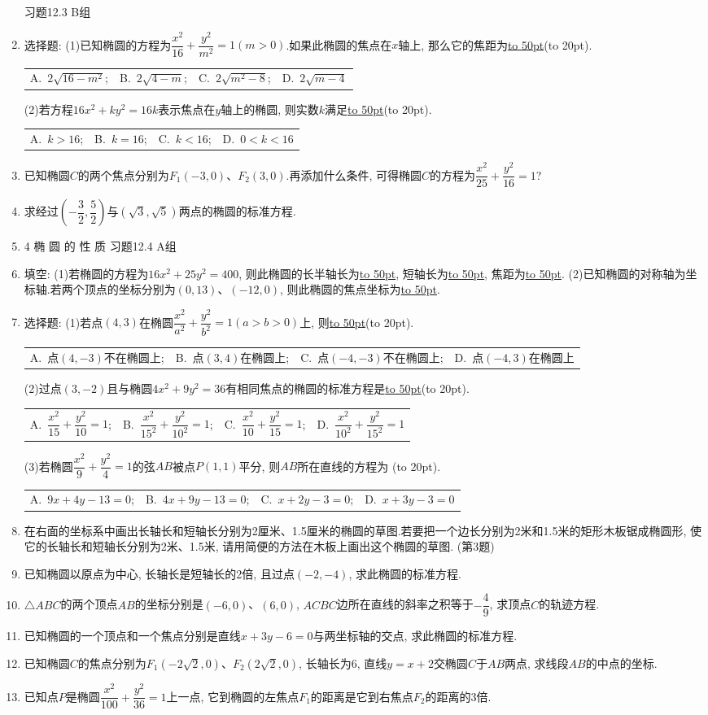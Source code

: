 \documentclass[10pt,a4paper]{article}
\newcommand{\blank}[1]{\underline{\hbox to #1pt{}}}
\newcommand{\bracket}[1]{(\hbox to #1pt{})}
\newcommand{\fourch}[4]{\par\begin{tabular}{p{.23\textwidth}p{.23\textwidth}p{.23\textwidth}p{.23\textwidth}}
A.~#1 &B.~#2& C.~#3& D.~#4
\end{tabular}}
\begin{document}
\begin{enumerate}[1.]
习题12.3  B组
\item 选择题:
(1)已知椭圆的方程为$\dfrac{x^2}{16}+\dfrac{y^2}{m^2}=1(m>0)$.如果此椭圆的焦点在$x$轴上, 那么它的焦距为\blank{50}\bracket{20}.
\fourch{$2\sqrt {16-m^2}$;}{$2\sqrt {4-m}$;}{$2\sqrt {m^2-8}$;}{$2\sqrt {m-4}$}
(2)若方程$16x^2+ky^2=16k$表示焦点在$y$轴上的椭圆, 则实数$k$满足\blank{50}\bracket{20}.
\fourch{$k>16$;}{$k=16$;}{$k<16$;}{$0<k<16$}
\item 已知椭圆$C$的两个焦点分别为$F_1(-3,0)$、$F_2(3,0)$.再添加什么条件, 可得椭圆$C$的方程为$\dfrac{x^2}{25}+\dfrac{y^2}{16}=1$?
\item 求经过$(-\dfrac 32,\dfrac 52)$与$(\sqrt 3,\sqrt 5)$两点的椭圆的标准方程.
\item 4  椭 圆 的 性 质
习题12.4  A组
\item 填空:
(1)若椭圆的方程为$16x^2+25y^2=400$, 则此椭圆的长半轴长为\blank{50}, 短轴长为\blank{50}, 焦距为\blank{50}.
(2)已知椭圆的对称轴为坐标轴.若两个顶点的坐标分别为$(0,13)$、$(-12,0)$, 则此椭圆的焦点坐标为\blank{50}.
\item 选择题:
(1)若点$(4,3)$在椭圆$\dfrac{x^2}{a^2}+\dfrac{y^2}{b^2}=1(a>b>0)$上, 则\blank{50}\bracket{20}.
\fourch{点$(4,-3)$不在椭圆上;}{点$(3,4)$在椭圆上;}{点$(-4,-3)$不在椭圆上;}{点$(-4,3)$在椭圆上}
(2)过点$(3,-2)$且与椭圆$4x^2+9y^2=36$有相同焦点的椭圆的标准方程是\blank{50}\bracket{20}.
\fourch{$\dfrac{x^2}{15}+\dfrac{y^2}{10}=1$;}{$\dfrac{x^2}{{{15}^2}}+\dfrac{y^2}{{{10}^2}}=1$;}{$\dfrac{x^2}{10}+\dfrac{y^2}{15}=1$;}{$\dfrac{x^2}{{{10}^2}}+\dfrac{y^2}{{{15}^2}}=1$}
(3)若椭圆$\dfrac{x^2}9+\dfrac{y^2}4=1$的弦$AB$被点$P(1,1)$平分, 则$AB$所在直线的方程为    \bracket{20}.
\fourch{$9x+4y-13=0$;}{$4x+9y-13=0$;}{$x+2y-3=0$;}{$x+3y-3=0$}
\item 在右面的坐标系中画出长轴长和短轴长分别为2厘米、1.5厘米的椭圆的草图.若要把一个边长分别为2米和1.5米的矩形木板锯成椭圆形, 使它的长轴长和短轴长分别为2米、1.5米, 请用简便的方法在木板上画出这个椭圆的草图.
(第3题)
\item 已知椭圆以原点为中心, 长轴长是短轴长的2倍, 且过点$(-2,-4)$, 求此椭圆的标准方程.
\item $\triangle ABC$的两个顶点$AB$的坐标分别是$(-6,0)$、$(6,0)$, $ACBC$边所在直线的斜率之积等于$-\dfrac 49$, 求顶点$C$的轨迹方程.
\item 已知椭圆的一个顶点和一个焦点分别是直线$x+3y-6=0$与两坐标轴的交点, 求此椭圆的标准方程.
\item 已知椭圆$C$的焦点分别为$F_1(-2\sqrt 2,0)$、$F_2(2\sqrt 2,0)$, 长轴长为6, 直线$y=x+2$交椭圆$C$于$AB$两点, 求线段$AB$的中点的坐标.
\item 已知点$P$是椭圆$\dfrac{x^2}{100}+\dfrac{y^2}{36}=1$上一点, 它到椭圆的左焦点$F_1$的距离是它到右焦点$F_2$的距离的3倍.

\end{enumerate}
\end{document}
